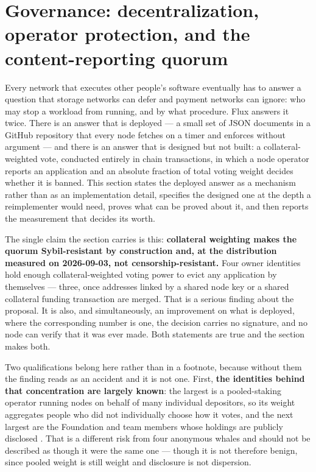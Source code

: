 \section{Governance: decentralization, operator protection, and the content-reporting quorum}
\label{sec:23-governance}\label{sec:governance}

Every network that executes other people's software eventually has to answer a question that
storage networks can defer and payment networks can ignore: who may stop a workload from running,
and by what procedure. Flux answers it twice. There is an answer that is deployed — a small set of
JSON documents in a GitHub repository that every node fetches on a timer and enforces without
argument — and there is an answer that is designed but not built: a collateral-weighted vote,
conducted entirely in chain transactions, in which a node operator reports an application and an
absolute fraction of total voting weight decides whether it is banned. This section states the
deployed answer as a mechanism rather than as an implementation detail, specifies the designed one
at the depth a reimplementer would need, proves what can be proved about it, and then reports the
measurement that decides its worth.

The single claim the section carries is this: \textbf{collateral weighting makes the quorum
Sybil-resistant by construction and, at the distribution measured on 2026-09-03, not
censorship-resistant.} Four owner identities hold enough collateral-weighted voting power to evict any
application by themselves --- three, once addresses linked by a shared node key or a shared collateral
funding transaction are merged. That is a serious finding about the proposal. It is also, and
simultaneously, an improvement on what is deployed, where the corresponding number is one, the
decision carries no signature, and no node can verify that it was ever made. Both statements are true
and the section makes both.

Two qualifications belong here rather than in a footnote, because without them the finding reads as
an accident and it is not one. First, \textbf{the identities behind that concentration are largely
known}: the largest is a pooled-staking operator running nodes on behalf of many individual
depositors, so its weight aggregates people who did not individually choose how it votes, and the
next largest are the Foundation and team members whose holdings are publicly disclosed
. That is a different risk from four anonymous whales and should not be
described as though it were the same one --- though it is not therefore benign, since pooled weight
is still weight and disclosure is not dispersion.

